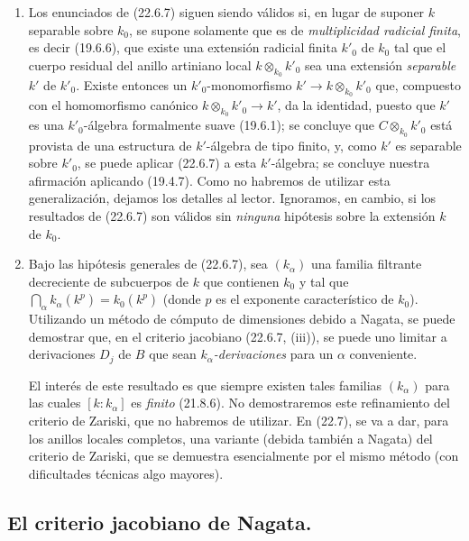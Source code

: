 \begin{remark}[22.6.9]
\label{0.22.6.9-fr}
\begin{enumerate}
  \item[\rm(i)] Los enunciados de (22.6.7) siguen siendo válidos si, en lugar de
  suponer $k$ separable sobre $k_0$, se supone solamente que es de
  \emph{multiplicidad radicial finita}, es decir (19.6.6), que existe
  una extensión radicial finita $k'_0$ de $k_0$ tal que el cuerpo residual del
  anillo artiniano local $k\otimes_{k_0}k'_0$ sea una extensión \emph{separable}
  $k'$ de $k'_0$. Existe entonces un $k'_0$-monomorfismo
  $k'\longrightarrow k\otimes_{k_0}k'_0$ que, compuesto con el homomorfismo
  canónico $k\otimes_{k_0}k'_0\longrightarrow k'$, da la identidad, puesto que
  $k'$ es una $k'_0$-álgebra formalmente suave (19.6.1); se concluye que
  $C\otimes_{k_0}k'_0$ está provista de una estructura de $k'$-álgebra de tipo finito,
  y, como $k'$ es separable sobre $k'_0$, se puede aplicar (22.6.7) a esta
  $k'$-álgebra; se concluye nuestra afirmación aplicando (19.4.7). Como
  no habremos de utilizar esta generalización, dejamos los detalles al
  lector. Ignoramos, en cambio, si los resultados de (22.6.7) son válidos sin
  \emph{ninguna} hipótesis sobre la extensión $k$ de $k_0$.
  \item[\rm(ii)] Bajo las hipótesis generales de (22.6.7), sea $(k_\alpha)$
  una familia filtrante decreciente de subcuerpos de $k$ que contienen $k_0$ y
  tal que
  $\bigcap_\alpha k_\alpha(k^p)=k_0(k^p)$ (donde $p$ es el exponente
  característico de $k_0$). Utilizando un método de cómputo de dimensiones
  debido a Nagata, se puede demostrar que, en el criterio jacobiano (22.6.7, (iii)),
  se puede uno limitar a derivaciones $D_j$ de $B$ que sean
  \emph{$k_\alpha$-derivaciones} para un $\alpha$ conveniente.


  El interés de este resultado es que siempre existen tales familias
  $(k_\alpha)$ para las cuales $[k:k_\alpha]$ es \emph{finito} (21.8.6). No
  demostraremos este refinamiento del criterio de Zariski, que no habremos de
  utilizar. En (22.7), se va a dar, para los anillos locales completos,
  una variante (debida también a Nagata) del criterio de Zariski, que se demuestra
  esencialmente por el mismo método (con dificultades técnicas algo
  mayores).
\end{enumerate}
\end{remark}

\subsection{El criterio jacobiano de Nagata.}
\label{subsection:0.22.7-fr}

